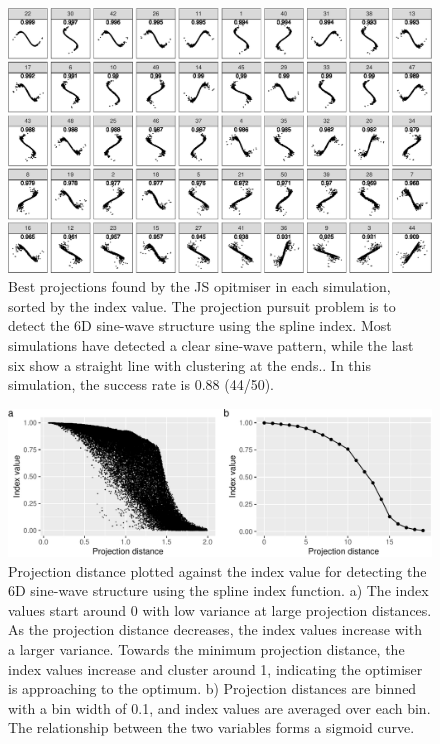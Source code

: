 \documentclass[
  number,
  preprint,
  3p]{elsarticle}
\begin{document}
\begin{figure}

{\centering \includegraphics{optim_files/figure-pdf/fig-projection-1.pdf}

}

\caption{\label{fig-projection}Best projections found by the JS
opitmiser in each simulation, sorted by the index value. The projection
pursuit problem is to detect the 6D sine-wave structure using the spline
index. Most simulations have detected a clear sine-wave pattern, while
the last six show a straight line with clustering at the ends.. In this
simulation, the success rate is 0.88 (44/50).}

\end{figure}

\begin{figure}

{\centering \includegraphics{optim_files/figure-pdf/fig-index-value-proj-dist-1.pdf}

}

\caption{\label{fig-index-value-proj-dist}Projection distance plotted
against the index value for detecting the 6D sine-wave structure using
the spline index function. a) The index values start around 0 with low
variance at large projection distances. As the projection distance
decreases, the index values increase with a larger variance. Towards the
minimum projection distance, the index values increase and cluster
around 1, indicating the optimiser is approaching to the optimum. b)
Projection distances are binned with a bin width of 0.1, and index
values are averaged over each bin. The relationship between the two
variables forms a sigmoid curve.}

\end{figure}
\end{document}
